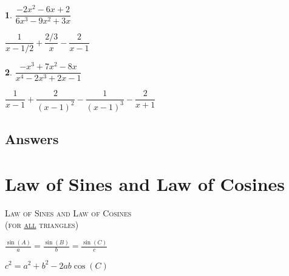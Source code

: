 \documentclass{amsbook}
\newtheorem{exc}{}
\newenvironment{ex}{\begin{exc}\normalfont}{\end{exc}}
\numberwithin{section}{chapter}
\numberwithin{equation}{chapter}
\newcommand{\ds}{\displaystyle}
\begin{document}
\begin{multicols}{2}
\begin{ex}
	$\dfrac{-2x^2-6x+2}{6x^3-9x^2+3x}$
	\begin{sol}
		$\dfrac{1}{x-1/2}+\dfrac{2/3}{x}-\dfrac{2}{x-1}$
	\end{sol}
\end{ex}

\begin{ex}
	$\dfrac{-x^3+7x^2-8x}{x^4-2x^3+2x-1}$
	\begin{sol}
		$\dfrac{1}{x-1}+\dfrac{2}{(x-1)^2} -\dfrac{1}{(x-1)^3}-\dfrac{2}{x+1}$
	\end{sol}
\end{ex}

\end{multicols}

\subsection*{Answers \nopunct} \hfill
\begin{multicols}{2}
	
\end{multicols}



\newpage

\section{Law of Sines and Law of Cosines}

\begin{multicols}{2}


\textsc{Law of Sines and Law of Cosines\\ (for \underline{all} triangles)}

\medskip
$\ds \frac{\sin(A)}{a} = \frac{\sin(B)}{b} = \frac{\sin(C)}{c}$

\smallskip
$c^2 = a^2 + b^2 - 2ab\cos(C) $

\end{multicols}
\end{document}
